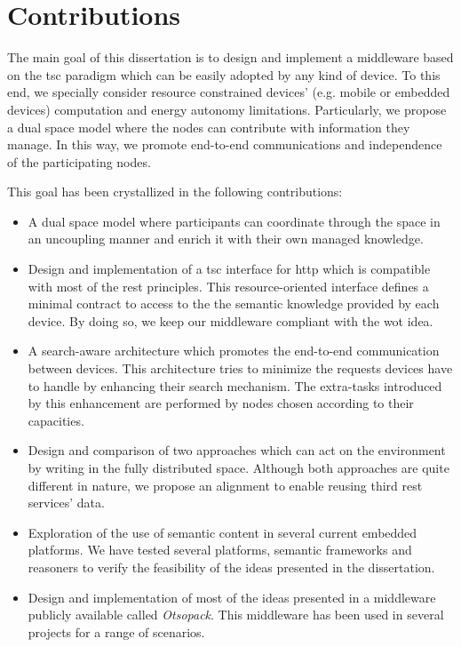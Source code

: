 \section{Contributions}
\label{sec:Contributions}

The main goal of this dissertation is to design and implement a middleware based on the \ac{tsc} paradigm which can be easily adopted by any kind of device.
To this end, we specially consider resource constrained devices' (e.g. mobile or embedded devices) computation and energy autonomy limitations.
Particularly, we propose a dual space model where the nodes can contribute with information they manage. %
In this way, we promote end-to-end communications and independence of the participating nodes.


This goal has been crystallized in the following contributions:

\begin{itemize} %
  \item A dual space model where participants can coordinate through the space in an uncoupling manner and enrich it with their own managed knowledge.
  \item Design and implementation of a \ac{tsc} interface for \ac{http} which is compatible with most of the \ac{rest} principles.
	This resource-oriented interface defines a minimal contract to access to the the semantic knowledge provided by each device.
	By doing so, we keep our middleware compliant with the \ac{wot} idea. %
  \item A search-aware architecture which promotes the end-to-end communication between devices. %
	This architecture tries to minimize the requests devices have to handle by enhancing their search mechanism.
	The extra-tasks introduced by this enhancement are performed by nodes chosen according to their capacities.
  \item Design and comparison of two approaches which can act on the environment by writing in the fully distributed space.
	Although both approaches are quite different in nature, we propose an alignment to enable reusing third \ac{rest} services' data.
  \item Exploration of the use of semantic content in several current embedded platforms.
	We have tested several platforms, semantic frameworks and reasoners to verify the feasibility of the ideas presented in the dissertation.
  \item Design and implementation of most of the ideas presented in a middleware publicly available called \emph{Otsopack}. %
	This middleware has been used in several projects for a range of scenarios.
\end{itemize}